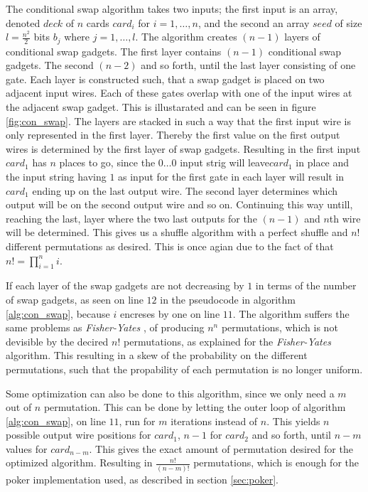 \documentclass[twoside,11pt,openright]{report}
\newcommand{\FY}{\textit{Fisher-Yates} }
\begin{document}
The conditional swap algorithm takes two inputs; the first input is an array, denoted $deck$ of $n$ cards $card_i$ for $i=1,\dots,n$, and the second an array $seed$ of size $l=\frac{n^2}{2}$ bits $b_j$ where $j=1,\dots, l$. The algorithm creates $(n-1)$ layers of conditional swap gadgets. The first layer contains $(n-1)$ conditional swap gadgets. The second $(n-2)$ and so forth, until the last layer consisting of one gate. Each layer is constructed such, that a swap gadget is placed on two adjacent input wires. Each of these gates overlap with one of the input wires at the adjacent swap gadget. This is illustarated and can be seen in figure \ref{fig:con_swap}. The layers are stacked in such a way that the first input wire is only represented in the first layer. Thereby the first value on the first output wires is determined by the first layer of swap gadgets. Resulting in the first input $card_1$ has $n$ places to go, since the $0\dots0$ input strig will leave$card_1$ in place and the input string having $1$ as input for the first gate in each layer will result in $card_1$ ending up on the last output wire. The second layer determines which output will be on the second output wire and so on. Continuing this way untill, reaching the last, layer where the two last outputs for the $(n-1)$ and $n$th wire will be determined. This gives us a shuffle algorithm with a perfect shuffle and $n!$ different permutations as desired. This is once agian due to the fact of that $n!=\prod_{i=1}^n i$.

If each layer of the swap gadgets are not decreasing by $1$ in terms of the number of swap gadgets, as seen on line $12$ in the pseudocode in algorithm \ref{alg:con_swap}, because $i$ encreses by one on line $11$. The algorithm suffers the same problems as \FY, of producing $n^n$ permutations, which is not devisible by the decired $n!$ permutations, as explained for the \FY algorithm. This resulting in a skew of the probability on the different permutations, such that the propability of each permutation is no longer uniform.

\bigskip

Some optimization can also be done to this algorithm, since we only need a $m$ out of $n$ permutation. This can be done by letting the outer loop of algorithm \ref{alg:con_swap}, on line $11$, run for $m$ iterations instead of $n$. This yields $n$ possible output wire positions for $card_1$, $n-1$ for $card_2$ and so forth, until $n-m$ values for $card_{n-m}$. This gives the exact amount of permutation desired for the optimized algorithm. Resulting in $\frac{n!}{(n-m)!}$ permutations, which is enough for the poker implementation used, as described in section \ref{sec:poker}.
\end{document}
